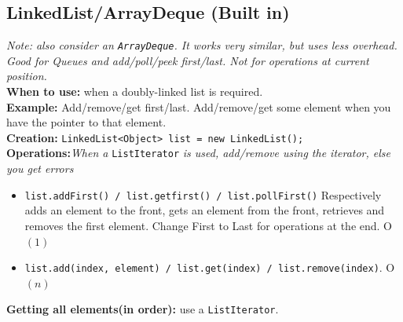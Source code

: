 \documentclass[a4paper,10pt]{article}
\begin{document}
\begin{multicols}{2}
\subsection{LinkedList/ArrayDeque (Built in)}\label{sec:LinkedList/ArrayDeque}
\textit{Note: also consider an \lstinline|ArrayDeque|. It works very similar, but uses less overhead. Good for Queues and add/poll/peek first/last. Not for operations at current position.}\\
\textbf{When to use:} when a doubly-linked list is required.\\
\textbf{Example:} Add/remove/get first/last. Add/remove/get some element when you have the pointer to that element.\\
\textbf{Creation:} \lstinline|LinkedList<Object> list = new LinkedList();|\\
\textbf{Operations:}\textit{When a }\lstinline|ListIterator|\textit{ is used, add/remove using the iterator, else you get errors}
\begin{itemize}[nolistsep,noitemsep]
\itemsep0em
\item \lstinline|list.addFirst() / list.getfirst() / list.pollFirst()| Respectively adds an element to the front, gets an element from the front, retrieves and removes the first element. Change First to Last for operations at the end. O$(1)$
\item \lstinline|list.add(index, element) / list.get(index) / list.remove(index)|. O$(n)$
\end{itemize}
\textbf{Getting all elements(in order):} use a \lstinline|ListIterator|.


\end{multicols}
\end{document}
